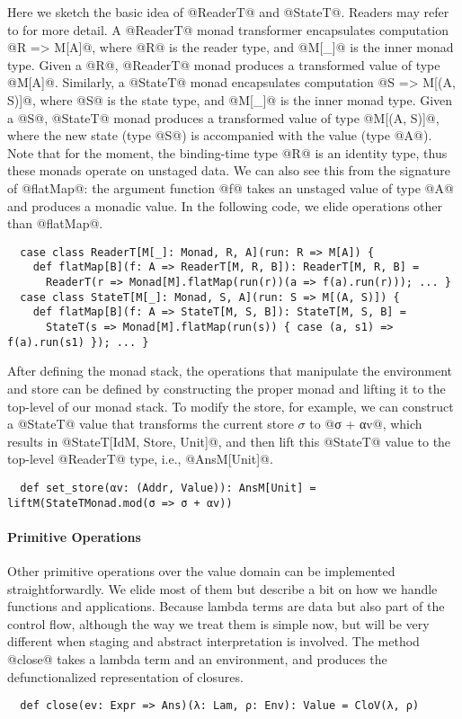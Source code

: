 Here we sketch the basic idea of @ReaderT@ and @StateT@. Readers may
refer to \cite{DBLP:conf/popl/LiangHJ95, Chiusano:2014:FPS:2688794} for more detail.
A @ReaderT@ monad transformer encapsulates computation @R => M[A]@, where
@R@ is the reader type, and @M[_]@ is the inner monad type.
Given a @R@, @ReaderT@ monad produces a transformed value of type @M[A]@.
Similarly, a @StateT@ monad encapsulates computation @S => M[(A, S)]@, where
@S@ is the state type, and @M[_]@ is the inner monad type.
Given a @S@, @StateT@ monad produces a transformed value of type @M[(A, S)]@,
where the new state (type @S@) is accompanied with the value (type @A@).
Note that for the moment, the binding-time type @R@ is an identity type, thus
these monads operate on unstaged data. We can also see this from the
signature of @flatMap@: the argument function @f@ takes an unstaged value of type @A@ and
produces a monadic value. In the following code, we elide operations other than @flatMap@.
\begin{lstlisting}
  case class ReaderT[M[_]: Monad, R, A](run: R => M[A]) {
    def flatMap[B](f: A => ReaderT[M, R, B]): ReaderT[M, R, B] =
      ReaderT(r => Monad[M].flatMap(run(r))(a => f(a).run(r))); ... }
  case class StateT[M[_]: Monad, S, A](run: S => M[(A, S)]) {
    def flatMap[B](f: A => StateT[M, S, B]): StateT[M, S, B] =
      StateT(s => Monad[M].flatMap(run(s)) { case (a, s1) => f(a).run(s1) }); ... }
\end{lstlisting}

After defining the monad stack, the operations that manipulate the environment
and store can be defined by constructing the proper monad and lifting it to the
top-level of our monad stack. To modify the store, for example, we can construct a
@StateT@ value that transforms the current store $\sigma$ to @σ + αv@, which
results in @StateT[IdM, Store, Unit]@, and then lift this @StateT@ value to the
top-level @ReaderT@ type, i.e., @AnsM[Unit]@.
\begin{lstlisting}
  def set_store(αv: (Addr, Value)): AnsM[Unit] = liftM(StateTMonad.mod(σ => σ + αv))
\end{lstlisting}

\paragraph{Primitive Operations}
Other primitive operations over the value domain can be implemented
straightforwardly. We elide most of them but describe a bit on how we handle
functions and applications. Because lambda terms are data but also part of the
control flow, although the way we treat them is simple now, but will be very
different when staging and abstract interpretation is involved. The method
@close@ takes a lambda term and an environment, and produces the
defunctionalized representation of closures.
\begin{lstlisting}
  def close(ev: Expr => Ans)(λ: Lam, ρ: Env): Value = CloV(λ, ρ)
\end{lstlisting}

